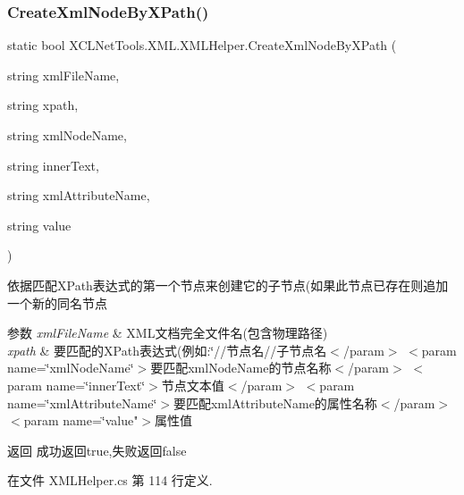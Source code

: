 \subsubsection{\texorpdfstring{Create\+Xml\+Node\+By\+X\+Path()}{CreateXmlNodeByXPath()}}
{\footnotesize\ttfamily static bool X\+C\+L\+Net\+Tools.\+X\+M\+L.\+X\+M\+L\+Helper.\+Create\+Xml\+Node\+By\+X\+Path (\begin{DoxyParamCaption}\item[{string}]{xml\+File\+Name,  }\item[{string}]{xpath,  }\item[{string}]{xml\+Node\+Name,  }\item[{string}]{inner\+Text,  }\item[{string}]{xml\+Attribute\+Name,  }\item[{string}]{value }\end{DoxyParamCaption})\hspace{0.3cm}{\ttfamily [static]}}



依据匹配\+X\+Path表达式的第一个节点来创建它的子节点(如果此节点已存在则追加一个新的同名节点 


\begin{DoxyParams}{参数}
{\em xml\+File\+Name} & X\+M\+L文档完全文件名(包含物理路径)\\
\hline
{\em xpath} & 要匹配的\+X\+Path表达式(例如\+:\char`\"{}//节点名//子节点名$<$/param$>$
$<$param name=\char`\"{}xml\+Node\+Name\char`\"{}$>$要匹配xml\+Node\+Name的节点名称$<$/param$>$
$<$param name=\char`\"{}inner\+Text\char`\"{}$>$节点文本值$<$/param$>$
$<$param name=\char`\"{}xml\+Attribute\+Name\char`\"{}$>$要匹配xml\+Attribute\+Name的属性名称$<$/param$>$
$<$param name=\char`\"{}value"$>$属性值\\
\hline
\end{DoxyParams}
\begin{DoxyReturn}{返回}
成功返回true,失败返回false
\end{DoxyReturn}


在文件 X\+M\+L\+Helper.\+cs 第 114 行定义.

\mbox{\label{class_x_c_l_net_tools_1_1_x_m_l_1_1_x_m_l_helper_a07059a8c89a84c359cc9893c842a263e}} 
